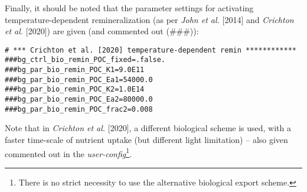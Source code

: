\documentclass[11pt,fleqn]{book} %
\begin{document}
\begin{itemize}[noitemsep]
\vspace{1mm}
Finally, it should be noted that the parameter settings for activating temperature-dependent remineralization (as per \textit{John et al.} [2014] and \textit{Crichton et al.} [2020]) are given (and commented out (\#\#\#)):
\small\vspace{-1mm}\begin{verbatim}
# *** Crichton et al. [2020] temperature-dependent remin ************
###bg_ctrl_bio_remin_POC_fixed=.false.
###bg_par_bio_remin_POC_K1=9.0E11
###bg_par_bio_remin_POC_Ea1=54000.0
###bg_par_bio_remin_POC_K2=1.0E14
###bg_par_bio_remin_POC_Ea2=80000.0
###bg_par_bio_remin_POC_frac2=0.008
\end{verbatim}\vspace{-1mm}\normalsize
Note that in \textit{Crichton et al.} [2020], a different biological scheme is used, with a faster time-scale of nutrient uptake (but different light limitation) -- also given commented out in the \textit{user-config}\footnote{There is no strict necessity to use the alternative biological export scheme.}.


\end{itemize}
\end{document}
